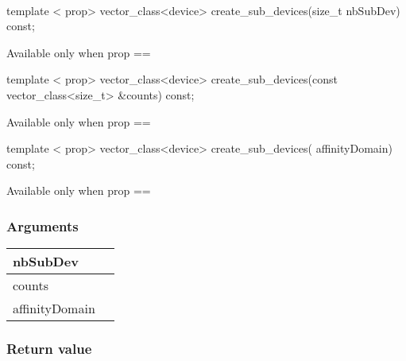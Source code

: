 \documentclass[letterpaper,10pt,english]{sphinxmanual}
\begin{document}
\paragraph{}
\label{\detokenize{programming-interface/runtime/device:create-sub-devices}}\begin{sphinxalltt}
template \textless{} prop\textgreater{}
vector\_class\textless{}device\textgreater{} create\_sub\_devices(size\_t nbSubDev) const; \begin{footnote}[4]\sphinxAtStartFootnote
Available only when prop == 
\end{footnote}

template \textless{} prop\textgreater{}
vector\_class\textless{}device\textgreater{} create\_sub\_devices(const vector\_class\textless{}size\_t\textgreater{} \&counts) const; \begin{footnote}[5]\sphinxAtStartFootnote
Available only when prop == 
\end{footnote}

template \textless{} prop\textgreater{}
vector\_class\textless{}device\textgreater{} create\_sub\_devices( affinityDomain) const; \begin{footnote}[6]\sphinxAtStartFootnote
Available only when prop == 
\end{footnote}
\end{sphinxalltt}
\subsubsection*{Arguments}


\begin{savenotes}\sphinxattablestart
\centering
\begin{tabulary}{\linewidth}[t]{|T|T|}
\hline

nbSubDev
&\\
\hline
counts
&\\
\hline
affinityDomain
&\\
\hline
\end{tabulary}
\par
\sphinxattableend\end{savenotes}
\subsubsection*{Return value}
\end{document}

